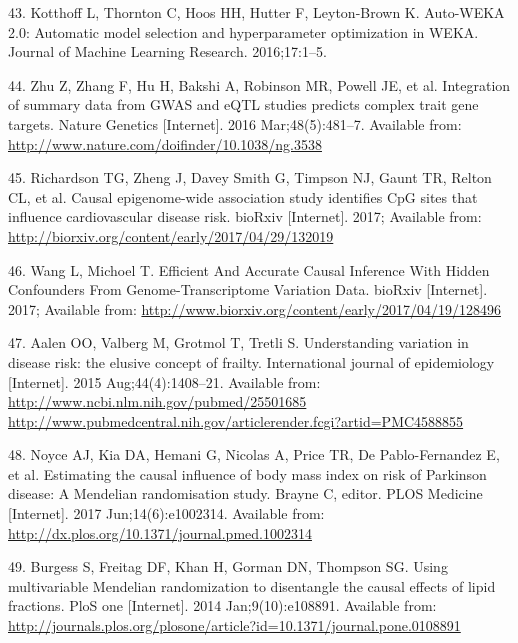 \documentclass[]{article}
\begin{document}
\hypertarget{ref-kotthoff2016auto}{}
43. Kotthoff L, Thornton C, Hoos HH, Hutter F, Leyton-Brown K. Auto-WEKA
2.0: Automatic model selection and hyperparameter optimization in WEKA.
Journal of Machine Learning Research. 2016;17:1--5.

\hypertarget{ref-Zhu2016}{}
44. Zhu Z, Zhang F, Hu H, Bakshi A, Robinson MR, Powell JE, et al.
Integration of summary data from GWAS and eQTL studies predicts complex
trait gene targets. Nature Genetics {[}Internet{]}. 2016
Mar;48(5):481--7. Available from:
\url{http://www.nature.com/doifinder/10.1038/ng.3538}

\hypertarget{ref-Richardson2017}{}
45. Richardson TG, Zheng J, Davey Smith G, Timpson NJ, Gaunt TR, Relton
CL, et al. Causal epigenome-wide association study identifies CpG sites
that influence cardiovascular disease risk. bioRxiv {[}Internet{]}.
2017; Available from:
\url{http://biorxiv.org/content/early/2017/04/29/132019}

\hypertarget{ref-Wang2017}{}
46. Wang L, Michoel T. Efficient And Accurate Causal Inference With
Hidden Confounders From Genome-Transcriptome Variation Data. bioRxiv
{[}Internet{]}. 2017; Available from:
\url{http://www.biorxiv.org/content/early/2017/04/19/128496}

\hypertarget{ref-Aalen2015}{}
47. Aalen OO, Valberg M, Grotmol T, Tretli S. Understanding variation in
disease risk: the elusive concept of frailty. International journal of
epidemiology {[}Internet{]}. 2015 Aug;44(4):1408--21. Available from:
\href{http://www.ncbi.nlm.nih.gov/pubmed/25501685\%20http://www.pubmedcentral.nih.gov/articlerender.fcgi?artid=PMC4588855}{http://www.ncbi.nlm.nih.gov/pubmed/25501685 http://www.pubmedcentral.nih.gov/articlerender.fcgi?artid=PMC4588855}

\hypertarget{ref-Noyce2017}{}
48. Noyce AJ, Kia DA, Hemani G, Nicolas A, Price TR, De Pablo-Fernandez
E, et al. Estimating the causal influence of body mass index on risk of
Parkinson disease: A Mendelian randomisation study. Brayne C, editor.
PLOS Medicine {[}Internet{]}. 2017 Jun;14(6):e1002314. Available from:
\url{http://dx.plos.org/10.1371/journal.pmed.1002314}

\hypertarget{ref-Burgess2014a}{}
49. Burgess S, Freitag DF, Khan H, Gorman DN, Thompson SG. Using
multivariable Mendelian randomization to disentangle the causal effects
of lipid fractions. PloS one {[}Internet{]}. 2014 Jan;9(10):e108891.
Available from:
\url{http://journals.plos.org/plosone/article?id=10.1371/journal.pone.0108891}
\end{document}
